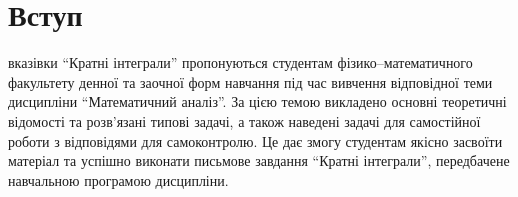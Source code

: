 \chapter*{Вступ}  %
вказівки ``Кратні інтеграли'' пропонуються студентам фізико--математичного факультету денної та заочної форм навчання
під час вивчення відповідної теми дисципліни ``Математичний аналіз''. За цією темою викладено основні теоретичні
відомості та розв’язані типові задачі, а також наведені задачі для самостійної роботи з відповідями для самоконтролю. Це
дає змогу студентам якісно засвоїти матеріал та успішно виконати письмове завдання ``Кратні інтеграли'', передбачене
навчальною програмою дисципліни.
